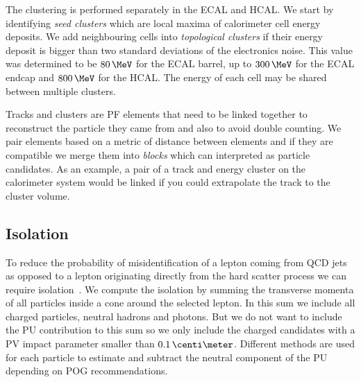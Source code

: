 The clustering is performed separately in the \gls{ECAL} and \gls{HCAL}. We start by identifying \textit{seed clusters} which are local maxima of calorimeter cell energy deposits. We add neighbouring cells into \textit{topological clusters} if their energy deposit is bigger than two standard deviations of the electronics noise. This value was determined to be $80\,\MeV$ for the \gls{ECAL} barrel, up to $300\,\MeV$ for the \gls{ECAL} endcap and $800\,\MeV$ for the \gls{HCAL}. The energy of each cell may be shared between multiple clusters.

Tracks and clusters are \gls{PF} elements that need to be linked together to reconstruct the particle they came from and also to avoid double counting. We pair elements based on a metric of distance between elements and if they are compatible we merge them into \textit{blocks} which can interpreted as particle candidates. As an example, a pair of a track and energy cluster on the calorimeter system would be linked if you could extrapolate the track to the cluster volume.


\subsection{Isolation}
\label{SUBSECTION:EventReconstructionAndSimulation_ParticleFlow_LeptonIsolation}


To reduce the probability of misidentification of a lepton coming from \gls{QCD} jets as opposed to a lepton originating directly from the hard scatter process we can require isolation~\cite{ARTICLE:CMSElectronReconstruction8TeV, ARTICLE:CMSMuonReconstruction7TeV}. We compute the isolation by summing the transverse momenta of all particles inside a cone around the selected lepton. In this sum we include all charged particles, neutral hadrons and photons. But we do not want to include the \gls{PU} contribution to this sum so we only include the charged candidates with a \gls{PV} impact parameter smaller than $0.1 \,\centi\meter$. Different methods are used for each particle to estimate and subtract the neutral component of the \gls{PU} depending on \gls{POG} recommendations.


